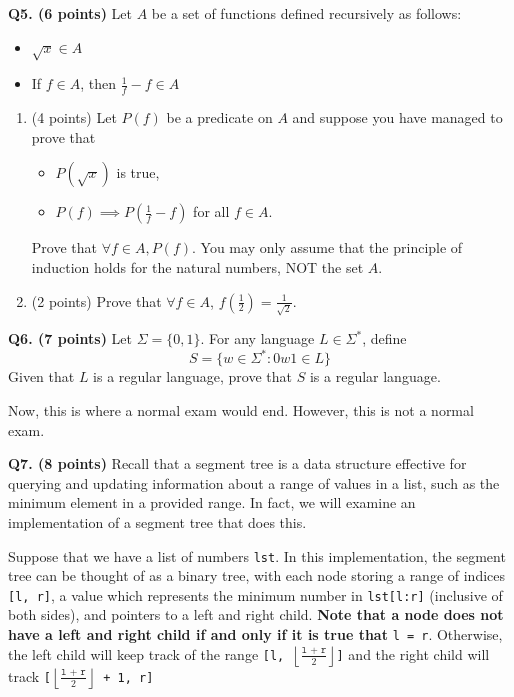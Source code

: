\documentclass{article}
\begin{document}
    \pagebreak

    \noindent\textbf{Q5. (6 points)} Let \(A\) be a set of functions defined recursively as follows:
    \begin{itemize}
        \item \(\sqrt{x} \in A\) 
        \item If \(f \in A\), then \(\frac{1}{f} - f \in A\) 
    \end{itemize}
    
    \begin{enumerate}[label=\alph*)]
        \item (4 points) Let \(P(f)\) be a predicate on \(A\) and suppose you have managed to prove that
        \begin{itemize}
            \item \(P(\sqrt{x})\) is true,
            \item \(P(f) \implies P(\frac{1}{f} - f)\) for all \(f \in A\).
        \end{itemize}
        Prove that \(\forall f \in A, P(f)\). You may only assume that the principle of induction holds for the natural numbers, NOT the set \(A\).
        \vfill
        \item (2 points) Prove that \(\forall f \in A\), \(f \left( \frac{1}{2} \right) = \frac{1}{\sqrt{2}}\).
        \vfill
    \end{enumerate}

    \pagebreak

    \noindent\textbf{Q6. (7 points)} Let \(\Sigma = \{0, 1\}\). For any language \(L \in \Sigma ^*\), define
    \[
        S = \{w \in \Sigma ^* : 0w1 \in L\}
    \]
    Given that \(L\) is a regular language, prove that \(S\) is a regular language.

    \pagebreak

    Now, this is where a normal exam would end. However, this is not a normal exam.

    \bigskip

    \noindent\textbf{Q7. (8 points)} Recall that a segment tree is a data structure effective for querying and updating information about a range of values in a list, such as the minimum element in a provided range. In fact, we will examine an implementation of a segment tree that does this.

    \medskip

    Suppose that we have a list of numbers \texttt{lst}. In this implementation, the segment tree can be thought of as a binary tree, with each node storing a range of indices \texttt{[l, r]}, a value which represents the minimum number in \texttt{lst[l:r]} (inclusive of both sides), and pointers to a left and right child. \textbf{Note that a node does not have a left and right child if and only if it is true that} \texttt{l = r}. Otherwise, the left child will keep track of the range \texttt{[l, \(\left\lfloor \frac{\texttt{l + r}}{2} \right\rfloor\)]} and the right child will track \texttt{[\(\left\lfloor \frac{\texttt{l + r}}{2} \right\rfloor\) + 1, r]}
\end{document}
